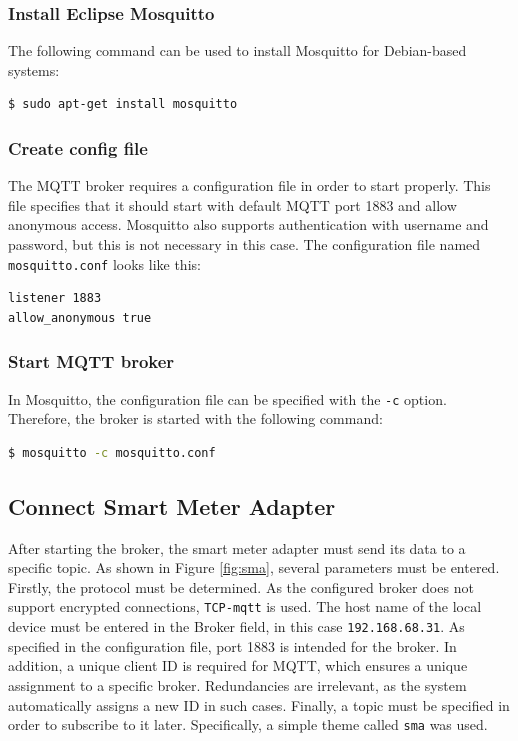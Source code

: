 \subsubsection{Install Eclipse Mosquitto} The following command can be used to install Mosquitto for Debian-based systems:

\begin{lstlisting}[language=bash]
$ sudo apt-get install mosquitto
\end{lstlisting}

\subsubsection{Create config file} The MQTT broker requires a configuration file in order to start properly. This file specifies that it should start with default MQTT port 1883 and allow anonymous access. Mosquitto also supports authentication with username and password, but this is not necessary in this case. The configuration file named \lstinline{mosquitto.conf} looks like this:

\begin{lstlisting}
listener 1883
allow_anonymous true
\end{lstlisting}

\subsubsection{Start MQTT broker} In Mosquitto, the configuration file can be specified with the \lstinline{-c} option. Therefore, the broker is started with the following command:

\begin{lstlisting}[language=bash]
$ mosquitto -c mosquitto.conf
\end{lstlisting}

\subsection{Connect Smart Meter Adapter}

After starting the broker, the smart meter adapter must send its data to a specific topic. As shown in Figure \ref{fig:sma}, several parameters must be entered. Firstly, the protocol must be determined. As the configured broker does not support encrypted connections, \lstinline{TCP-mqtt} is used. The host name of the local device must be entered in the Broker field, in this case \lstinline{192.168.68.31}. As specified in the configuration file, port 1883 is intended for the broker. In addition, a unique client ID is required for MQTT, which ensures a unique assignment to a specific broker. Redundancies are irrelevant, as the system automatically assigns a new ID in such cases. Finally, a topic must be specified in order to subscribe to it later. Specifically, a simple theme called \lstinline{sma} was used.

